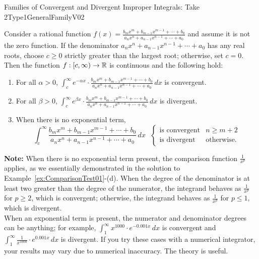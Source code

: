 \begin{propColor}{Families of Convergent and Divergent Improper Integrals: Take 2}{Type1GeneralFamilyV02}

Consider a rational function $f(x) = \frac{b_m x^m + b_{m-1} x^{m-1} +  \cdots + b_0}{a_n x^n + a_{n-1} x^{n-1} +  \cdots + a_0}$ and assume it is not the zero function. If the denominator $a_n x^n + a_{n-1} x^{n-1} +  \cdots + a_0$ has any real roots, choose $c\ge 0$ strictly greater than the largest root; otherwise, set $c=0$. Then the function $f:[c, \infty) \to \mathbb R$ is continuous and the following hold:

\begin{enumerate}
\renewcommand{\labelenumi}{(\alph{enumi})}
\setlength{\itemsep}{.2cm}
    \item For all $\alpha>0$, $\int_c^\infty e^{-\alpha x} \cdot\frac{b_m x^m + b_{m-1} x^{m-1} +  \cdots + b_0}{a_n x^n + a_{n-1} x^{n-1} +  \cdots + a_0}\, dx$ is convergent.

    \item  For all $\beta>0$, $\int_c^\infty e^{\beta x} \cdot\frac{b_m x^m + b_{m-1} x^{m-1} +  \cdots + b_0}{a_n x^n + a_{n-1} x^{n-1} +  \cdots + a_0}\, dx$ is divergent.

   \item When there is no exponential term, 
   $$ \int_c^\infty \frac{b_m x^m + b_{m-1} x^{m-1} +  \cdots + b_0}{a_n x^n + a_{n-1} x^{n-1} +  \cdots + a_0}\, dx ~~~
   \begin{cases}
       \text{is convergent} & n \ge m+2\\
       \text{is divergent} & \text{otherwise}.
   \end{cases}
   $$
   \end{enumerate}
\bigskip
   
\textbf{Note:} When there is no exponential term present, the comparison function $\frac{1}{x^p}$ applies, as we essentially demonstrated in the solution to Example~\ref{ex:ComparisonTest01}-(d). When the degree of the denominator is at least two greater than the degree of the numerator, the integrand behaves as $\frac{1}{x^p}$ for $p\ge 2$, which is convergent; otherwise, the integrand behaves as $\frac{1}{x^p}$ for $p \le 1$, which is divergent. \\

When an exponential term is present, the numerator and denominator degrees can be anything; for example,  $\int_1^\infty x^{1000} \cdot e^{-0.001 x}\, dx$ is convergent and  $\int_1^\infty \frac{1}{x^{1000}} \cdot e^{0.001 x}\, dx$ is divergent. If you try these cases with a numerical integrator, your results may vary due to numerical inaccuracy. The theory is useful. 

    
\end{propColor}


